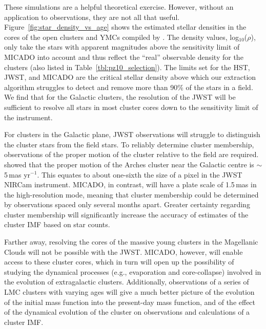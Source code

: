 \documentclass{aa}
\newcommand{\s}{$\sim$}
\newcommand{\h}[1]{$^{#1}$}
\begin{document}
These simulations are a helpful theoretical exercise.
However, without an application to observations, they are not all that useful.
Figure~\ref{fig:star_density_vs_age} shows the estimated stellar densities in the cores of the open clusters and YMCs compiled by \citet{portegies2010}.
The density values, log$_{10}$($\rho$), only take the stars with apparent magnitudes above the sensitivity limit of MICADO into account and thus reflect the ``real'' observable density for the clusters (also listed in Table~\ref{tbl:pz10_selection}).
The limits set for the HST, JWST, and MICADO are the critical stellar density above which our extraction algorithm struggles to detect and remove more than 90\% of the stars in a field.
We find that for the Galactic clusters, the resolution of the JWST will be sufficient to resolve all stars in most cluster cores down to the sensitivity limit of the instrument.

For clusters in the Galactic plane, JWST observations will struggle to distinguish the cluster stars from the field stars.
To reliably determine cluster membership, observations of the proper motion of the cluster relative to the field are required.
\citet{stolte2008} showed that the proper motion of the Arches cluster near the Galactic centre is \s5\,mas yr\h{-1}.
This equates to about one-sixth the size of a pixel in the JWST NIRCam instrument.
MICADO, in contrast, will have a plate scale of 1.5\,mas in the high-resolution mode, meaning that cluster membership could be determined by observations spaced only several months apart.
Greater certainty regarding cluster membership will significantly increase the accuracy of estimates of the cluster IMF based on star counts.

Farther away, resolving the cores of the massive young clusters in the Magellanic Clouds will not be possible with the JWST. MICADO, however, will enable access to these cluster cores, which in turn will open up the possibility of studying the dynamical processes (e.g., evaporation and core-collapse) involved in the evolution of extragalactic clusters.
Additionally, observations of a series of LMC clusters with varying ages will give a much better picture of the evolution of the initial mass function into the present-day mass function, and of the effect of the dynamical evolution of the cluster on observations and calculations of a cluster IMF\@.
\end{document}
